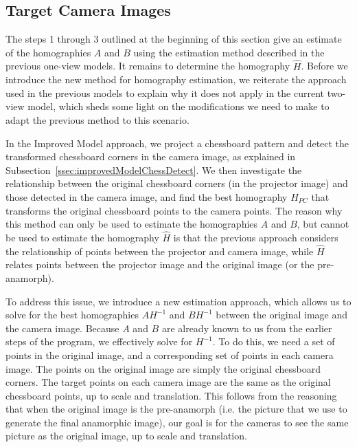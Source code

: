 \documentclass[11pt, oneside, reqno]{book}
\begin{document}
\subsection{Target Camera Images}
\label{ssec:2viewTargetCamera}

The steps 1 through 3 outlined at the beginning of this section give an estimate of the homographies $A$ and $B$ using the estimation method described in the previous one-view models. It remains to determine the homography $\widehat{H}$. Before we introduce the new method for homography estimation, we reiterate the approach used in the previous models to explain why it does not apply in the current two-view model, which sheds some light on the modifications we need to make to adapt the previous method to this scenario.

In the Improved Model approach, we project a chessboard pattern and detect the transformed chessboard corners in the camera image, as explained in Subsection~\ref{ssec:improvedModelChessDetect}. We then investigate the relationship between the original chessboard corners (in the projector image) and those detected in the camera image, and find the best homography $H_{PC}$ that transforms the original chessboard points to the camera points. The reason why this method can only be used to estimate the homographies $A$ and $B$, but cannot be used to estimate the homography $\widehat{H}$ is that the previous approach considers the relationship of points between the projector and camera image, while
$\widehat{H}$ relates points between the projector image and the original image (or the pre-anamorph). 

To address this issue, we introduce a new estimation approach, which allows us to solve for the best homographies $AH^{-1}$ and $BH^{-1}$ between the original image and the camera image. Because $A$ and $B$ are already known to us from the earlier steps of the program, we effectively solve for $H^{-1}$. To do this, we need a set of points in the original image, and a corresponding set of points in each camera image. The points on the original image are simply the original chessboard corners. The target points on each camera image are the same as the original chessboard points, up to scale and translation. This follows from the reasoning that when the original image is the pre-anamorph (i.e. the picture that we use to generate the final anamorphic image), our goal is for the cameras to see the same picture as the original image, up to scale and translation.
\end{document}
